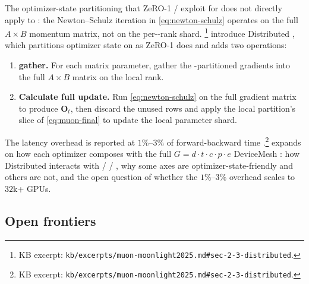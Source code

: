 The optimizer-state partitioning that ZeRO-1 /  exploit for
 \citep[\S 2.2.4]{torchtitan2024} does not directly apply to
: the Newton--Schulz iteration in \cref{eq:newton-schulz}
operates on the full $A \times B$ momentum matrix, not on the
per--rank shard. \citet[\S
2.3]{muon-moonlight2025}\footnote{KB excerpt:
\nolinkurl{kb/excerpts/muon-moonlight2025.md#sec-2-3-distributed}.}
introduce Distributed , which partitions optimizer state on  as
ZeRO-1 does and adds two operations:
\begin{enumerate}
\item \textbf{ gather.} For each matrix parameter, gather the
-partitioned gradients into the full $A \times B$ matrix on the
local rank.
\item \textbf{Calculate full update.} Run \cref{eq:newton-schulz} on
the full gradient matrix to produce $\mathbf{O}_t$, then discard the
unused rows and apply the local partition's slice of \cref{eq:muon-final}
to update the local parameter shard.
\end{enumerate}
The latency overhead is reported at $1$\%--$3$\% of forward-backward
time \citep[\S 2.3]{muon-moonlight2025}.\footnote{KB excerpt:
\nolinkurl{kb/excerpts/muon-moonlight2025.md#sec-2-3-distributed}.}
 expands on how each optimizer
composes with the full $G = d \cdot t \cdot c \cdot p \cdot e$
DeviceMesh \citep[\S 4]{torchtitan2024}: how Distributed 
interacts with  /  / , why some axes are
optimizer-state-friendly and others are not, and the open question of
whether the $1$\%--$3$\% overhead scales to $32$k+ GPUs.

\subsection{Open frontiers}
\label{sec:opt-open}

